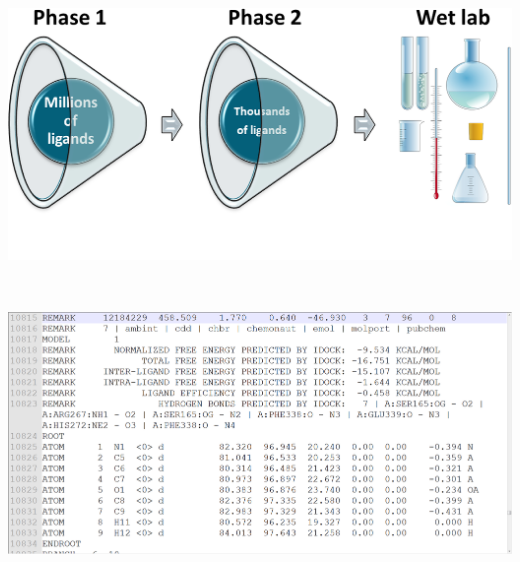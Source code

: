 \documentclass[12pt]{article}
\begin{document}
\clearpage

\begin{center}
\includegraphics[width=\linewidth,keepaspectratio=true]{2PhaseDocking.png}
\end{center}

\clearpage

\begin{center}
\begin{figure}
\centering
{}
\\
\end{figure}
\end{center}

\clearpage

\begin{center}
\includegraphics[width=\linewidth,keepaspectratio=true]{OutputPDBQT.png}
\end{center}
\end{document}
